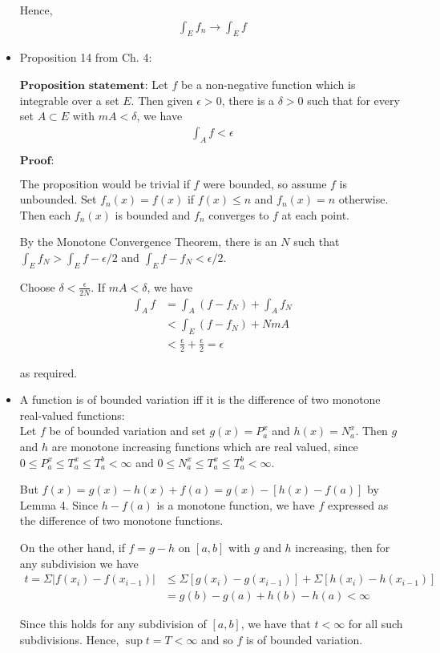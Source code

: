 \documentclass[12pt]{article}
\begin{document}
\begin{itemize}
Hence,
\begin{align*}
\int_E f_n \to \int_E f
\end{align*}

\item Proposition 14 from Ch. 4:

$\textbf{Proposition statement:}$ Let $f$ be a non-negative function which is integrable over a set $E$. Then given $\epsilon > 0$, there is a $\delta > 0$ such that for every set $A \subset E$ with $mA < \delta$, we have
\begin{align*}
\int_A f < \epsilon
\end{align*}

$\textbf{Proof:}$

The proposition would be trivial if $f$ were bounded, so assume $f$ is unbounded. Set $f_n(x) = f(x)$ if $f(x) \leq n$ and $f_n(x) = n$ otherwise. Then each $f_n(x)$ is bounded and $f_n$ converges to $f$ at each point.

By the Monotone Convergence Theorem, there is an $N$ such that $\int_E f_N > \int_E f - \epsilon/2$ and $\int_E f - f_N < \epsilon/2$.

Choose $\delta < \frac{\epsilon}{2N}$. If $mA < \delta$, we have
\begin{align*}
\int_A f &= \int_A (f - f_N) + \int_A f_N\\
&< \int_E (f - f_N) + NmA\\
&< \frac{\epsilon}{2} + \frac{\epsilon}{2} = \epsilon
\end{align*}

as required.
\\
\item A function is of bounded variation iff it is the difference of two monotone real-valued functions:\\

Let $f$ be of bounded variation and set $g(x) = P^x_a$ and $h(x) = N_a^x$. Then $g$ and $h$ are monotone increasing functions which are real valued, since $0 \leq P_a^x \leq T_a^x \leq T_a^b < \infty$ and $0 \leq N_a^x \leq T_a^x \leq T_a^b < \infty$.

But $f(x) = g(x) - h(x) + f(a) = g(x) - [h(x) - f(a)]$ by Lemma 4. Since $h - f(a)$ is a monotone function, we have $f$ expressed as the difference of two monotone functions.

On the other hand, if $f = g - h$ on $[a, b]$ with $g$ and $h$ increasing, then for any subdivision we have
\begin{align*}
t = \Sigma |f(x_i) - f(x_{i-1})| &\leq \Sigma [g(x_i) - g(x_{i-1})] + \Sigma [h(x_i) - h(x_{i-1})]\\
&= g(b) - g(a) + h(b) - h(a) < \infty
\end{align*}

Since this holds for any subdivision of $[a, b]$, we have that $t < \infty$ for all such subdivisions. Hence, $\sup t = T < \infty$ and so $f$ is of bounded variation.
\end{itemize}
\end{document}
